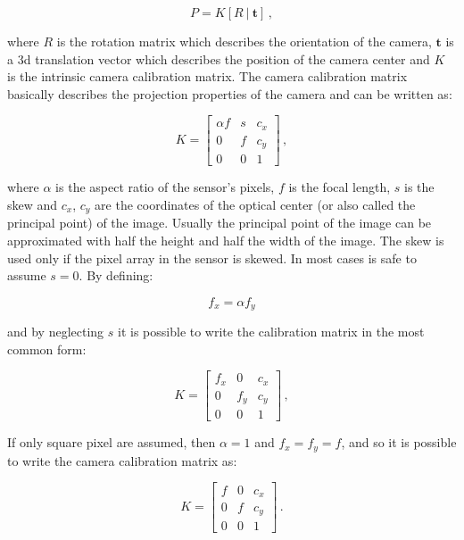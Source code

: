 \begin{equation*}
  P = K[R \ | \ \mathbf{t}] \,,
\end{equation*}

where $R$ is the rotation matrix which describes the orientation of the camera, $\mathbf{t}$ is a \acrshort{3d} translation vector which describes the position of the camera center and $K$ is the intrinsic camera calibration matrix.
The camera calibration matrix basically describes the projection properties of the camera and can be written as:

\begin{equation*}
  K = \begin{bmatrix}
    \alpha f & s & c_x \\
    0        & f & c_y \\
    0        & 0 & 1
  \end{bmatrix} \,,
\end{equation*}

where $\alpha$ is the aspect ratio of the sensor's pixels, $f$ is the focal length, $s$ is the skew and $c_x$, $c_y$ are the coordinates of the optical center (or also called the principal point) of the image. Usually the principal point of the image can be approximated with half the height and half the width of the image. The skew is used only if the pixel array in the sensor is skewed. In most cases is safe to assume $s = 0$.
By defining:

\begin{equation*}
  f_x = \alpha f_y
\end{equation*}

and by neglecting $s$ it is possible to write the calibration matrix in the most common form:

\begin{equation*}
  K = \begin{bmatrix}
    f_x & 0   & c_x \\
    0   & f_y & c_y \\
    0   & 0   & 1
  \end{bmatrix} \,,
\end{equation*}

If only square pixel are assumed, then $\alpha = 1 $ and $ f_x = f_y = f$, and so it is possible to write the camera calibration matrix as:

\begin{equation*}
  K = \begin{bmatrix}
    f & 0 & c_x \\
    0 & f & c_y \\
    0 & 0 & 1
  \end{bmatrix} \,.
\end{equation*}

